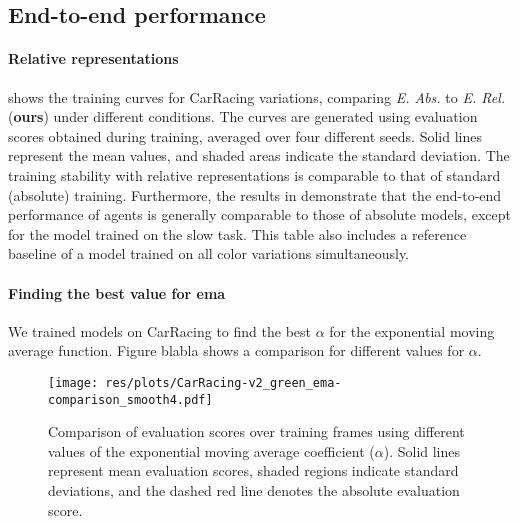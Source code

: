 \subsection{End-to-end performance}\label{sec:exp-end-to-end-performance}
\paragraph{Relative representations}\label{subsec:relrepr-end-to-end}
 shows the training curves for CarRacing variations, comparing \emph{E. Abs.} to \emph{E. Rel.} (\textbf{ours}) under different conditions. The curves are generated using evaluation scores obtained during training, averaged over four different seeds. Solid lines represent the mean values, and shaded areas indicate the standard deviation. The training stability with relative representations is comparable to that of standard (absolute) training.
Furthermore, the results in  demonstrate that the end-to-end performance of agents is generally comparable to those of absolute models, except for the model trained on the slow task. This table also includes a reference baseline of a model trained on all color variations simultaneously.


\paragraph{Finding the best value for ema}
We trained models on CarRacing to find the best $\alpha$ for the exponential moving average function. Figure blabla shows a comparison for different values for $\alpha$.
\begin{figure}[!t]
        \centering
        \texttt{[image: res/plots/CarRacing-v2\_green\_ema-comparison\_smooth4.pdf]}
        \caption{Comparison of evaluation scores over training frames using different values of the exponential moving average coefficient ($\alpha$). Solid lines represent mean evaluation scores, shaded regions indicate standard deviations, and the dashed red line denotes the absolute evaluation score.}
        \label{subfig:training-carracing-ema}
\end{figure}


